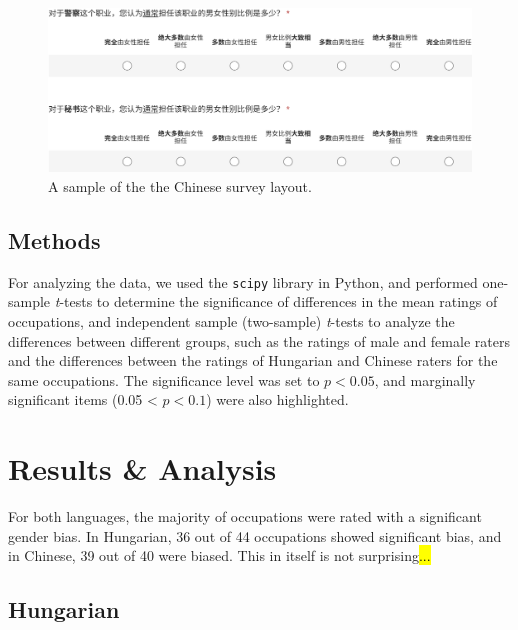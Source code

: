 \documentclass[11pt]{article}
\begin{document}
\begin{figure}[!ht]
  \centering
  \includegraphics[width=\linewidth]{../survey_zh}
  \caption{A sample of the the Chinese survey layout.}
  \label{fig:survey_zh}
\end{figure}

\subsection{Methods}

For analyzing the data, we used the \texttt{scipy} library in Python, and performed one-sample \textit{t}-tests to determine the significance of differences in the mean ratings of occupations, and independent sample (two-sample) \textit{t}-tests to analyze the differences between different groups, such as the ratings of male and female raters and the differences between the ratings of Hungarian and Chinese raters for the same occupations. The significance level was set to $p < 0.05$, and marginally significant items (0.05 < $p < 0.1$) were also highlighted.


\section{Results \& Analysis}\label{sec:results}

For both languages, the majority of occupations were rated with a significant gender bias. In Hungarian, 36 out of 44 occupations showed significant bias, and in Chinese, 39 out of 40 were biased. This in itself is not surprising\hl{...}

\subsection{Hungarian}
\end{document}
